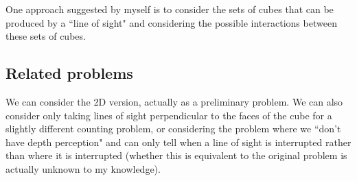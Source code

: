 One approach suggested by myself is to consider the sets of cubes that can be produced by a ``line of sight" and considering the possible interactions between these sets of cubes.

\subsection{Related problems}

We can consider the 2D version, actually as a preliminary problem. We can also consider only taking lines of sight perpendicular to the faces of the cube for a slightly different counting problem, or considering the problem where we ``don't have depth perception" and can only tell when a line of sight is interrupted rather than where it is interrupted (whether this is equivalent to the original problem is actually unknown to my knowledge).

